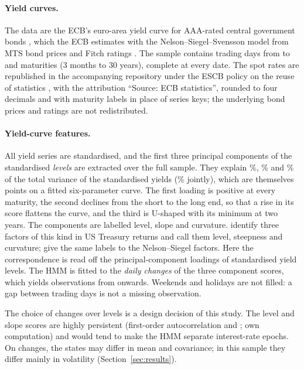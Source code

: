 \documentclass[11pt,a4paper]{article}
\begin{document}
\paragraph{Yield curves.} The data are the ECB's euro-area yield curve for AAA-rated central government bonds \citep{ecb_yc}, which the ECB estimates with the Nelson--Siegel--Svensson model from MTS bond prices and Fitch ratings \citep[pp.~1--2, 4]{ecb_ycmethod}. The sample contains \NLevelDays{} trading days from \StartLevel{} to \EndDate{} and \NMat{} maturities (3 months to 30 years), complete at every date. The spot rates are republished in the accompanying repository under the ESCB policy on the reuse of statistics \citep{escb_reuse}, with the attribution ``Source: ECB statistics'', rounded to four decimals and with maturity labels in place of series keys; the underlying bond prices and ratings are not redistributed.

\paragraph{Yield-curve features.} All \NMat{} yield series are standardised, and the first three principal components of the standardised \emph{levels} are extracted over the full sample. They explain \PCAone\%, \PCAtwo\% and \PCAthree\% of the total variance of the standardised yields (\PCAsum\% jointly), which are themselves points on a fitted six-parameter curve. The first loading is positive at every maturity, the second declines from the short to the long end, so that a rise in its score flattens the curve, and the third is U-shaped with its minimum at two years. The components are labelled level, slope and curvature. \citet[pp.~54, 57--58]{litterman1991} identify three factors of this kind in US Treasury returns and call them level, steepness and curvature; \citet{dieboldli2003} give the same labels to the Nelson--Siegel factors. Here the correspondence is read off the principal-component loadings of standardised yield levels. The HMM is fitted to the \emph{daily changes} of the three component scores, which yields \NDays{} observations from \StartChg{} onwards. Weekends and holidays are not filled: a gap between trading days is not a missing observation.

The choice of changes over levels is a design decision of this study. The level and slope scores are highly persistent (first-order autocorrelation \PCacfOne{} and \PCacfTwo{}; own computation) and would tend to make the HMM separate interest-rate epochs. On changes, the states may differ in mean and covariance; in this sample they differ mainly in volatility (Section~\ref{sec:results}).
\end{document}
